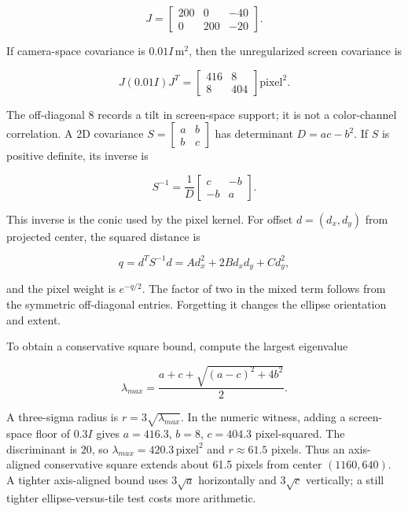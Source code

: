 \[
J=\begin{bmatrix}200&0&-40\\0&200&-20\end{bmatrix}.
\]

If camera-space covariance is \(0.01I\,\mathrm{m}^2\), then the unregularized screen covariance is

\[
J(0.01I)J^T=\begin{bmatrix}416&8\\8&404\end{bmatrix}\mathrm{pixel}^2.
\]

The off-diagonal \(8\) records a tilt in screen-space support; it is not a color-channel correlation. A 2D covariance \(S=\begin{bmatrix}a&b\\b&c\end{bmatrix}\) has determinant \(D=ac-b^2\). If \(S\) is positive definite, its inverse is

\[
S^{-1}=\frac1D\begin{bmatrix}c&-b\\-b&a\end{bmatrix}.
\]

This inverse is the conic used by the pixel kernel. For offset \(d=(d_x,d_y)\) from projected center, the squared distance is

\[
q=d^TS^{-1}d=A d_x^2+2B d_xd_y+C d_y^2,
\]

and the pixel weight is \(e^{-q/2}\). The factor of two in the mixed term follows from the symmetric off-diagonal entries. Forgetting it changes the ellipse orientation and extent.

To obtain a conservative square bound, compute the largest eigenvalue

\[
\lambda_{max}=\frac{a+c+\sqrt{(a-c)^2+4b^2}}2.
\]

A three-sigma radius is \(r=3\sqrt{\lambda_{max}}\). In the numeric witness, adding a screen-space floor of \(0.3I\) gives \(a=416.3\), \(b=8\), \(c=404.3\) pixel-squared. The discriminant is \(20\), so \(\lambda_{max}=420.3\,\mathrm{pixel}^2\) and \(r\approx61.5\) pixels. Thus an axis-aligned conservative square extends about 61.5 pixels from center \((1160,640)\). A tighter axis-aligned bound uses \(3\sqrt a\) horizontally and \(3\sqrt c\) vertically; a still tighter ellipse-versus-tile test costs more arithmetic.


